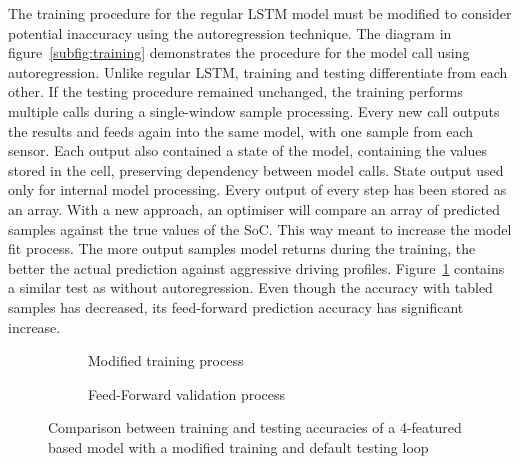 %
%
The training procedure for the regular LSTM model must be modified to consider potential inaccuracy using the autoregression technique.
The diagram in figure~\ref{subfig:training} demonstrates the procedure for the model call using autoregression.
Unlike regular LSTM, training and testing differentiate from each other.
If the testing procedure remained unchanged, the training performs multiple calls during a single-window sample processing.
Every new call outputs the results and feeds again into the same model, with one sample from each sensor.
Each output also contained a state of the model, containing the values stored in the cell, preserving dependency between model calls.
State output used only for internal model processing.
Every output of every step has been stored as an array.
With a new approach, an optimiser will compare an array of predicted samples against the true values of the SoC.
This way meant to increase the model fit process.
The more output samples model returns during the training, the better the actual prediction against aggressive driving profiles.
Figure~\ref{fig:modefied_tr} contains a similar test as without autoregression.
Even though the accuracy with tabled samples has decreased, its feed-forward prediction accuracy has significant increase.
\begin{figure}[htbp]
    \centering
    \begin{subfigure}[b]{0.45\textwidth}
        \centering
        
        \caption{Modified training process}
    \end{subfigure}
    \begin{subfigure}[b]{0.45\textwidth}
        \centering
        
        \caption{Feed-Forward validation process}
    \end{subfigure}
    \caption{Comparison between training and testing accuracies of a 4-featured based model with a modified training and default testing loop}
    \label{fig:modefied_tr}
\end{figure}